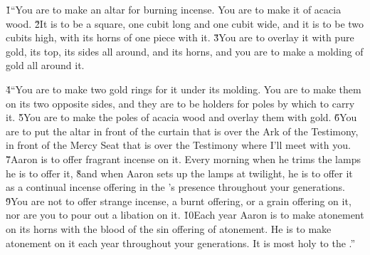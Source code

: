 \v{1}``You are to make an altar for burning incense. You are to make it of acacia wood. \v{2}It is to be a square, one cubit long and one cubit wide, and it is to be two cubits high, with its horns of one piece with it. \v{3}You are to overlay it with pure gold, its top, its sides all around, and its horns, and you are to make a molding of gold all around it.

\v{4}``You are to make two gold rings for it under its molding. You are to make them on its two opposite sides, and they are to be holders for poles by which to carry it. \v{5}You are to make the poles of acacia wood and overlay them with gold. \v{6}You are to put the altar in front of the curtain that is over the Ark of the Testimony, in front of the Mercy Seat that is over the Testimony where I'll meet with you. \v{7}Aaron is to offer fragrant incense on it. Every morning when he trims the lamps he is to offer it, \v{8}and when Aaron sets up the lamps at twilight, he is to offer it as a continual incense offering in the 's presence throughout your generations. \v{9}You are not to offer strange incense, a burnt offering, or a grain offering on it, nor are you to pour out a libation on it. \v{10}Each year Aaron is to make atonement on its horns with the blood of the sin offering of atonement. He is to make atonement on it each year throughout your generations. It is most holy to the .''

